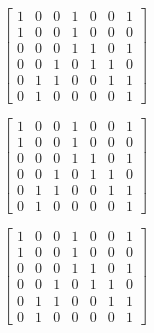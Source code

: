 \documentclass[table]{article}
\begin{document}
\vspace{1em}


\begin{minipage}{.5\linewidth}
$\begin{bmatrix}
1 & 0 & 0 & 1 & 0 & 0 & 1 \\
1 & 0 & 0 & 1 & 0 & 0 & 0 \\
0 & 0 & 0 & 1 & 1 & 0 & 1 \\
0 & 0 & 1 & 0 & 1 & 1 & 0 \\
0 & 1 & 1 & 0 & 0 & 1 & 1 \\
0 & 1 & 0 & 0 & 0 & 0 & 1 
\end{bmatrix}$
\end{minipage}
\begin{minipage}{.45\linewidth}
\end{minipage}

\vspace{1em}

\begin{minipage}{.5\linewidth}
$\begin{bmatrix}
1 & 0 & 0 & 1 & 0 & 0 & 1 \\
1 & 0 & 0 & 1 & 0 & 0 & 0 \\
0 & 0 & 0 & 1 & 1 & 0 & 1 \\
0 & 0 & 1 & 0 & 1 & 1 & 0 \\
0 & 1 & 1 & 0 & 0 & 1 & 1 \\
0 & 1 & 0 & 0 & 0 & 0 & 1 
\end{bmatrix}$
\end{minipage}
\begin{minipage}{.45\linewidth}
\end{minipage}

\vspace{1em}


\begin{minipage}{.5\linewidth}
$\begin{bmatrix}
1 & 0 & 0 & 1 & 0 & 0 & 1 \\
1 & 0 & 0 & 1 & 0 & 0 & 0 \\
0 & 0 & 0 & 1 & 1 & 0 & 1 \\
0 & 0 & 1 & 0 & 1 & 1 & 0 \\
0 & 1 & 1 & 0 & 0 & 1 & 1 \\
0 & 1 & 0 & 0 & 0 & 0 & 1 
\end{bmatrix}$
\end{minipage}
\begin{minipage}{.45\linewidth}
\end{minipage}
\end{document}
